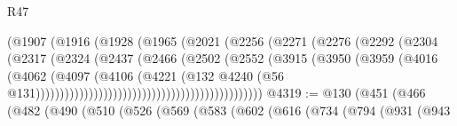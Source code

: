 \begin{lexlean}{R47}
\begin{coremodule}
                                              (@1907
                                                (@1916
                                                  (@1928
                                                    (@1965
                                                      (@2021
                                                        (@2256
                                                          (@2271
                                                            (@2276
                                                              (@2292
                                                                (@2304
                                                                  (@2317
                                                                    (@2324
                                                                      (@2437
                                                                        (@2466
                                                                          (@2502
                                                                            (@2552
                                                                              (@3915
                                                                                (@3950
                                                                                  (@3959
                                                                                    (@4016
                                                                                      (@4062
                                                                                        (@4097
                                                                                          (@4106
                                                                                            (@4221
                                                                                              (@132
                                                                                                @4240
                                                                                                (@56
                                                                                                  @131)))))))))))))))))))))))))))))))))))))))))))))))
@4319 := @130
    (@451
      (@466
        (@482
          (@490
            (@510
              (@526
                (@569
                  (@583
                    (@602
                      (@616
                        (@734
                          (@794
                            (@931
                              (@943

\end{coremodule}
\end{lexlean}
